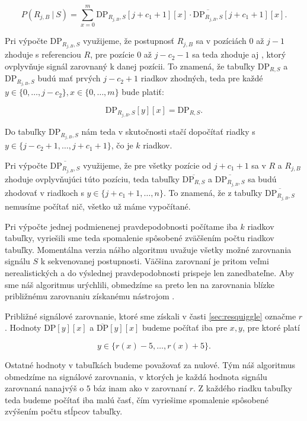 $$P(R_{j,B} ~|~ S) = \sum\limits_{x = 0}^m \mathrm{DP}_{R_{j,B},S}[j+c_1+1][x] \cdot \overline{\mathrm{DP}_{R_{j,B},S}}[j+c_1+1][x]\text{.}$$ 

Pri výpočte $\mathrm{DP}_{R_{j,B},S}$ využijeme, že postupnosť $R_{j,B}$ sa v pozíciách $0$ až $j-1$
zhoduje s referenciou $R$, pre pozície $0$ až $j-c_2-1$ sa teda zhoduje aj \kmer{}, ktorý ovplyvňuje
signál zarovnaný k danej pozícii. To znamená, že tabuľky $\mathrm{DP}_{R,S}$ a 
$\mathrm{DP}_{R_{j,B},S}$ budú mať prvých $j-c_2+1$ riadkov zhodných, teda pre každé $y \in \{0, \dots, j-c_2\}, x \in \{0, \dots, m\}$ bude platiť:

$$\mathrm{DP}_{R_{j,B},S}[y][x] = \mathrm{DP}_{R,S}\text{.}$$

Do tabuľky $\mathrm{DP}_{R_{j,B},S}$ nám teda v skutočnosti stačí dopočítať riadky s $y \in \{j-c_2+1, \dots, j+c_1+1\}$, čo je $k$ riadkov.

Pri výpočte $\overline{\mathrm{DP}_{R_{j,B},S}}$ využijeme, že pre všetky pozície od $j+c_1+1$ sa
v $R$ a $R_{j,B}$ zhoduje \kmer{} ovplyvňujúci túto pozíciu, teda tabuľky 
$\overline{\mathrm{DP}_{R, S}}$ a $\overline{\mathrm{DP}_{R_{j,B}, S}}$ sa budú zhodovať v riadkoch s 
$y \in \{j + c_1 + 1, \dots, n\}$. To znamená, že z tabuľky $\overline{\mathrm{DP}_{R_{j,B},S}}$ 
nemusíme počítať nič, všetko už máme vypočítané.

Pri výpočte jednej podmienenej pravdepodobnosti počítame iba $k$ riadkov tabuľky, vyriešili sme
teda spomalenie spôsobené zväčšením počtu riadkov tabuľky. 
Momentálna verzia nášho algoritmu uvažuje všetky možné zarovnania signálu $S$
k sekvenovanej postupnosti. Väčšina zarovnaní je pritom veľmi nerealistických a do výslednej
pravdepodobnosti prispeje len zanedbateľne. Aby sme náš algoritmus urýchlili, obmedzíme sa preto len
na zarovnania blízke približnému zarovnaniu získanému nástrojom \resquiggle{}.

Približné signálové zarovnanie, ktoré sme získali v časti \ref{sec:resquiggle} označme $r$. Hodnoty
$\mathrm{DP}[y][x]$ a $\overline{\mathrm{DP}}[y][x]$ budeme počítať iba pre $x, y$, pre ktoré
platí

$$y \in \{r(x)-5, \dots, r(x)+5\}\text{.}$$

Ostatné hodnoty v tabuľkách budeme považovať za nulové. Tým náš algoritmus obmedzíme na signálové
zarovnania, v ktorých je každá hodnota signálu zarovnaná nanajvýš o $5$ báz inam ako v zarovnaní $r$.
Z každého riadku tabuľky teda budeme počítať iba malú časť, čím vyriešime spomalenie spôsobené
zvýšením počtu stĺpcov tabuľky.

